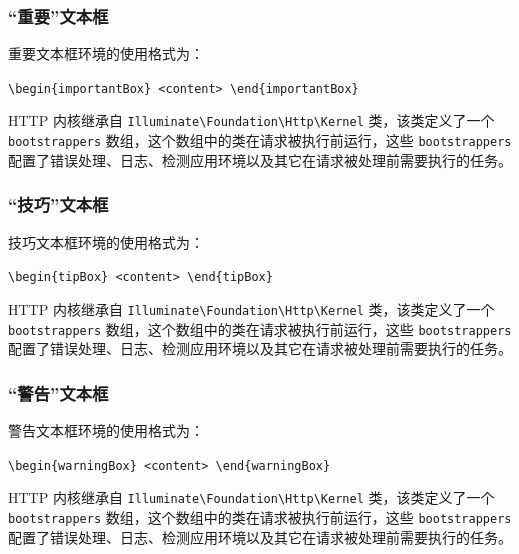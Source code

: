 \documentclass{sysucseexp}
\begin{document}
\subsubsection{\enquote{重要}文本框}
重要文本框环境的使用格式为：

\verb|\begin{importantBox} <content> \end{importantBox}|

\begin{importantBox}
  HTTP 内核继承自 \verb|Illuminate\Foundation\Http\Kernel| 类，该类定义了一个 \verb|bootstrappers| 数组，这个数组中的类在请求被执行前运行，这些 \verb|bootstrappers| 配置了错误处理、日志、检测应用环境以及其它在请求被处理前需要执行的任务。
\end{importantBox}
\subsubsection{\enquote{技巧}文本框}
技巧文本框环境的使用格式为：

\verb|\begin{tipBox} <content> \end{tipBox}|

\begin{tipBox}
  HTTP 内核继承自 \verb|Illuminate\Foundation\Http\Kernel| 类，该类定义了一个 \verb|bootstrappers| 数组，这个数组中的类在请求被执行前运行，这些 \verb|bootstrappers| 配置了错误处理、日志、检测应用环境以及其它在请求被处理前需要执行的任务。
\end{tipBox}
\subsubsection{\enquote{警告}文本框}
警告文本框环境的使用格式为：

\verb|\begin{warningBox} <content> \end{warningBox}|

\begin{warningBox}
  HTTP 内核继承自 \verb|Illuminate\Foundation\Http\Kernel| 类，该类定义了一个 \verb|bootstrappers| 数组，这个数组中的类在请求被执行前运行，这些 \verb|bootstrappers| 配置了错误处理、日志、检测应用环境以及其它在请求被处理前需要执行的任务。
\end{warningBox}
\end{document}
